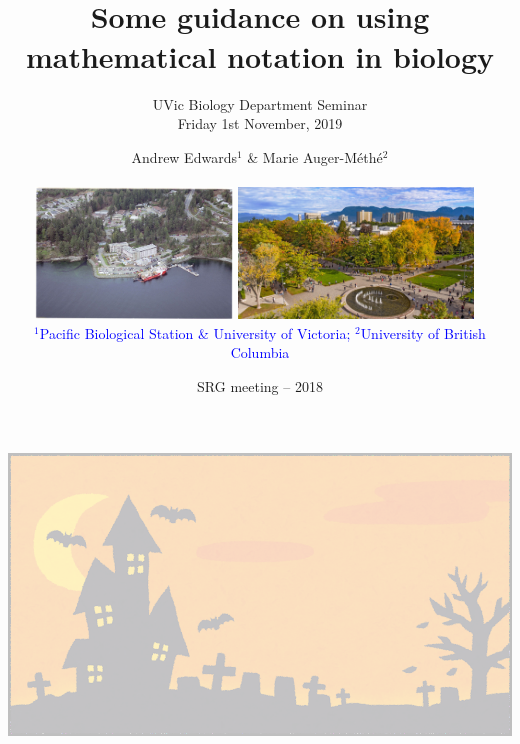 


\title[Notation]{~\\ Some guidance on using mathematical notation in biology}
\author{Andrew Edwards$^1$ \& Marie Auger-M\'eth\'e$^2$
  \\ ~\\
  \includegraphics[height=3.5cm]{images/pbs.png}
  \includegraphics[height=3.5cm]{images/ubc-aerial.jpg}
  ~\\ \textcolor{blue}{$^1$Pacific Biological Station \& University of Victoria;
  $^2$University of British Columbia}}
\date{{\footnotesize SRG meeting -- 2018}}
\subtitle{\small UVic Biology Department Seminar\\
Friday 1st November, 2019}

{\includegraphics[width=\paperwidth,height=\paperheight,keepaspectratio]{images/background-trans.png}}

